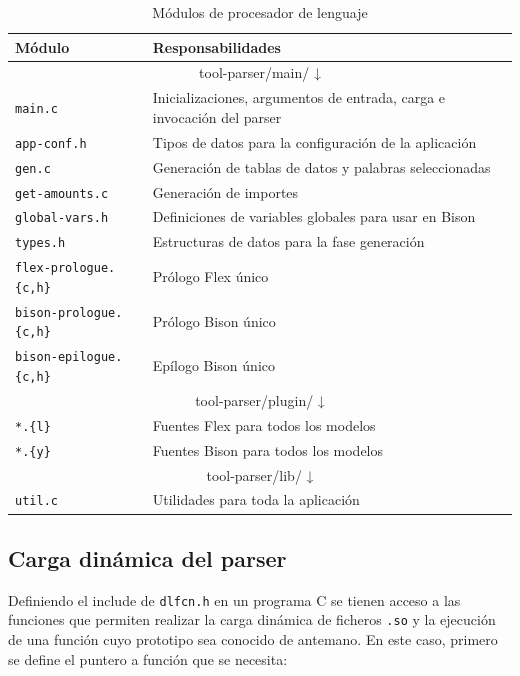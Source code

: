 \begin{table}[ht]
    \centering
    \begin{tabular}{l l}
        Módulo & Responsabilidades \\
        \hline
        \hline
        \multicolumn{2}{c}{tool-parser/main/ ↓} \\
        \hline    
        \verb|main.c| & Inicializaciones, argumentos de entrada, carga e invocación del parser \\
        \verb|app-conf.h| & Tipos de datos para la configuración de la aplicación \\
        \verb|gen.c| & Generación de tablas de datos y palabras seleccionadas \\
        \verb|get-amounts.c| & Generación de importes \\
        \verb|global-vars.h| & Definiciones de variables globales para usar en Bison \\
        \verb|types.h| & Estructuras de datos para la fase generación \\
        \verb|flex-prologue.{c,h}| & Prólogo Flex único \\
        \verb|bison-prologue.{c,h}| & Prólogo Bison único \\
        \verb|bison-epilogue.{c,h}| & Epílogo Bison único \\
        \hline
        \multicolumn{2}{c}{tool-parser/plugin/ ↓} \\            
        \hline        
        \verb|*.{l}| & Fuentes Flex para todos los modelos \\
        \verb|*.{y}| & Fuentes Bison para todos los modelos \\
        \hline
        \multicolumn{2}{c}{tool-parser/lib/ ↓} \\     
        \hline
        \verb|util.c| & Utilidades para toda la aplicación \\
    \end{tabular}
    \caption{Módulos de procesador de lenguaje}    
    \label{tab:modulos-procesador-lenguaje}
\end{table}

\subsection{Carga dinámica del parser}

Definiendo el include de \verb|dlfcn.h| en un programa C se tienen acceso a las funciones que permiten realizar la carga dinámica de ficheros \verb|.so| y la ejecución de una función cuyo prototipo sea conocido de antemano. En este caso, primero se define el puntero a función que se necesita:

